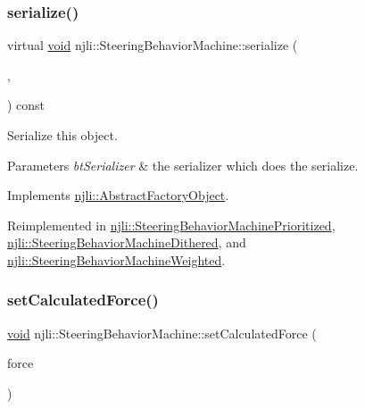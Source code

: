 \subsubsection{\texorpdfstring{serialize()}{serialize()}}
{\footnotesize\ttfamily virtual \mbox{\hyperlink{_thread_8h_af1e856da2e658414cb2456cb6f7ebc66}{void}} njli\+::\+Steering\+Behavior\+Machine\+::serialize (\begin{DoxyParamCaption}\item[{\mbox{\hyperlink{_thread_8h_af1e856da2e658414cb2456cb6f7ebc66}{void}} $\ast$}]{,  }\item[{bt\+Serializer $\ast$}]{ }\end{DoxyParamCaption}) const\hspace{0.3cm}{\ttfamily [virtual]}}

Serialize this object.


\begin{DoxyParams}{Parameters}
{\em bt\+Serializer} & the serializer which does the serialize. \\
\hline
\end{DoxyParams}


Implements \mbox{\hyperlink{classnjli_1_1_abstract_factory_object_aad2fbe86fb3bdecf02918a96b9c57976}{njli\+::\+Abstract\+Factory\+Object}}.



Reimplemented in \mbox{\hyperlink{classnjli_1_1_steering_behavior_machine_prioritized_a2f3fa591ca198f2d45b1d49d73173b65}{njli\+::\+Steering\+Behavior\+Machine\+Prioritized}}, \mbox{\hyperlink{classnjli_1_1_steering_behavior_machine_dithered_afabe12bcb2005f23bd4f7a79bd758cf2}{njli\+::\+Steering\+Behavior\+Machine\+Dithered}}, and \mbox{\hyperlink{classnjli_1_1_steering_behavior_machine_weighted_a384f337048a8483eeb7189f8fef0b664}{njli\+::\+Steering\+Behavior\+Machine\+Weighted}}.

\mbox{\label{classnjli_1_1_steering_behavior_machine_ae8765d78cf8e8df73c72fdf9448d587e}} 
\subsubsection{\texorpdfstring{set\+Calculated\+Force()}{setCalculatedForce()}}
{\footnotesize\ttfamily \mbox{\hyperlink{_thread_8h_af1e856da2e658414cb2456cb6f7ebc66}{void}} njli\+::\+Steering\+Behavior\+Machine\+::set\+Calculated\+Force (\begin{DoxyParamCaption}\item[{const bt\+Vector3 \&}]{force }\end{DoxyParamCaption})\hspace{0.3cm}{\ttfamily [protected]}}

